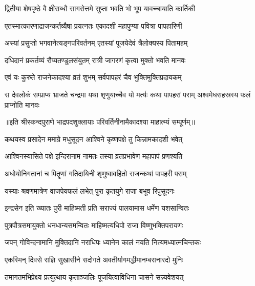 \twolineshloka
{द्वितीया शेषपृष्ठे वै क्षीराब्धौ सागरोत्तमे}
{सुप्ता भवति भो भूप यावच्चायाति कार्तिकी} %

\twolineshloka
{एतस्मात्कारणाद्राजन्कर्तव्यैषा प्रयत्नतः}
{एकादशी महापुण्या पवित्रा पापहारिणी} %

\twolineshloka
{अस्यां प्रसुप्तो भगवानेत्यङ्गपरिवर्तनम्}
{एतस्यां पूजयेदेवं त्रैलोक्यस्य पितामहम्} %

\twolineshloka
{दधिदानं प्रकर्तव्यं रौप्यतण्डुलसंयुतम्}
{रात्री जागरणं कृत्वा मुक्तो भवति मानवः} %

\twolineshloka
{एवं यः कुरुते राजनेकादश्या व्रतं शुभम्}
{सर्वपापहरं चैव भुक्तिमुक्तिप्रदायकम्} %

\threelineshloka
{स देवलोकं सम्प्राप्य भ्राजते चन्द्रमा यथा}
{शृणुयाच्चैव यो मर्त्यः कथा पापहरां पराम्}
{अश्वमेधसहस्रस्य फलं प्राप्नोति मानवः} %

॥इति श्रीस्कन्दपुराणे भाद्रपदशुक्लायाः परिवर्तिनीनामैकादश्या माहात्म्यं सम्पूर्णम्॥


\hyperref[sec:ekadashi_mahatmyam_vrata_raja]{\closesub}
\clearpage

\label{sec:vrata-raja-ashvina-krishnendira}


\twolineshloka
{कथयस्व प्रसादेन ममाग्रे मधुसूदन}
{आश्विने कृष्णपक्षे तु किन्नामकादशी भवेत्} %


\twolineshloka
{आश्विनस्यासिते पक्षे इन्दिरानाम नामतः}
{तस्या व्रतप्रभावेण महापापं प्रणश्यति} %

\twolineshloka
{अधोयोनिगतानां च पितॄणां गतिदायिनी}
{शृणुष्वावहितो राजन्कथां पापहरी पराम्} %

\twolineshloka
{यस्याः श्रवणमात्रेण वाजपेयफलं लभेत्}
{पुरा कृतयुगे राजा बभूव रिपुसूदनः} %

\twolineshloka
{इन्द्रसेन इति ख्यातः पुरी माहिष्मती प्रति}
{सराज्यं पालयामास धर्मेण यशसान्वितः} %

\twolineshloka
{पुत्रपौत्रसमायुक्तो धनधान्यसमन्वितः}
{माहिष्मत्यधिपो राजा विष्णुभक्तिपरायणः} %

\twolineshloka
{जपन् गोविन्दनामानि मुक्तिदानि नराधिपः}
{ध्यानेन कालं नयति नित्यमध्यात्मचिन्तकः} %

\twolineshloka
{एकस्मिन् दिवसे राज्ञि सुखासीने सदोगते}
{अवतीर्यागमद्धीमानम्बरानारदो मुनिः} %

\twolineshloka
{तमागतमभिप्रेक्ष्य प्रत्युत्थाय कृताञ्जलिः}
{पूजयित्वाविधिना चासने सन्न्यवेशयत्} %


